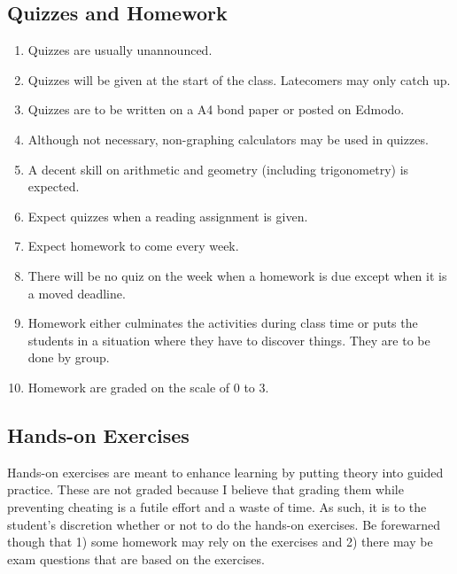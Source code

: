 \documentclass[10pt]{article}
\begin{document}
\subsection{Quizzes and Homework}
\begin{enumerate}[noitemsep]
\item Quizzes are usually unannounced.
\item Quizzes will be given at the start of the class. Latecomers may only catch up.
\item Quizzes are to be written on a A4 bond paper or posted on Edmodo.
\item Although not necessary, non-graphing calculators may be used in quizzes.
\item A decent skill on arithmetic and geometry (including trigonometry) is expected.
\item Expect quizzes when a reading assignment is given.
\item Expect homework to come every week.
\item There will be no quiz on the week when a homework is due except when it is a moved deadline.
\item Homework either culminates the activities during class time or puts the students in a situation where they have to discover things. They are to be done by group.
\item Homework are graded on the scale of 0 to 3.
\end{enumerate}

\subsection{Hands-on Exercises}
Hands-on exercises are meant to enhance learning by putting theory into guided practice. These are not graded because I believe that grading them while preventing cheating is a futile effort and a waste of time. As such, it is to the student's discretion whether or not to do the hands-on exercises. Be forewarned though that 1) some homework may rely on the exercises and 2) there may be exam questions that are based on the exercises.
\end{document}
